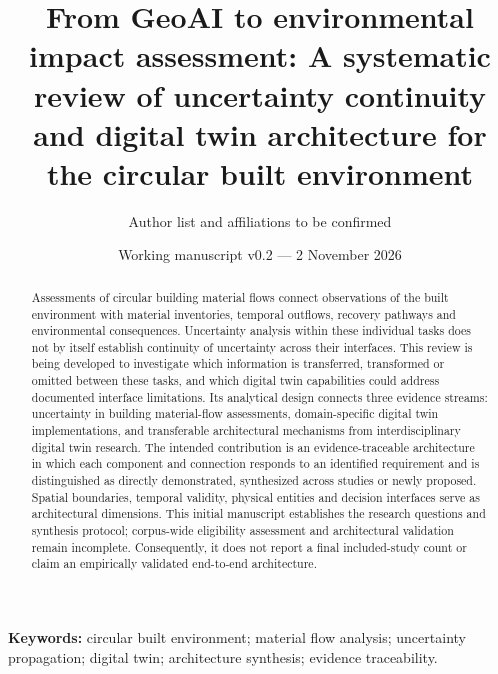 \documentclass[11pt,a4paper]{article}
\title{From GeoAI to environmental impact assessment: A systematic review of uncertainty continuity and digital twin architecture for the circular built environment}
\author{Author list and affiliations to be confirmed}
\date{Working manuscript v0.2 --- 2 November 2026}
\begin{document}
\maketitle
\begin{abstract}
Assessments of circular building material flows connect observations of the built environment with material inventories, temporal outflows, recovery pathways and environmental consequences. Uncertainty analysis within these individual tasks does not by itself establish continuity of uncertainty across their interfaces. This review is being developed to investigate which information is transferred, transformed or omitted between these tasks, and which digital twin capabilities could address documented interface limitations. Its analytical design connects three evidence streams: uncertainty in building material-flow assessments, domain-specific digital twin implementations, and transferable architectural mechanisms from interdisciplinary digital twin research. The intended contribution is an evidence-traceable architecture in which each component and connection responds to an identified requirement and is distinguished as directly demonstrated, synthesized across studies or newly proposed. Spatial boundaries, temporal validity, physical entities and decision interfaces serve as architectural dimensions. This initial manuscript establishes the research questions and synthesis protocol; corpus-wide eligibility assessment and architectural validation remain incomplete. Consequently, it does not report a final included-study count or claim an empirically validated end-to-end architecture.
\end{abstract}
\noindent\textbf{Keywords:} circular built environment; material flow analysis; uncertainty propagation; digital twin; architecture synthesis; evidence traceability.








\end{document}
